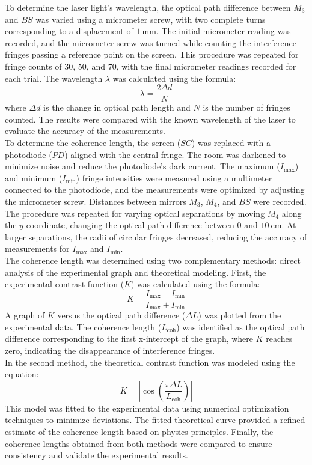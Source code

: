 \documentclass[a4paper,11pt]{article}
\begin{document}
To determine the laser light's wavelength, the optical path difference between \(M_3\) and \(BS\) was varied using a micrometer screw, with two complete turns corresponding to a displacement of \(1~\text{mm}\). The initial micrometer reading was recorded, and the micrometer screw was turned while counting the interference fringes passing a reference point on the screen. This procedure was repeated for fringe counts of \(30\), \(50\), and \(70\), with the final micrometer readings recorded for each trial. The wavelength \(\lambda\) was calculated using the formula:
\[
\lambda = \frac{2 \Delta d}{N}
\]
where \(\Delta d\) is the change in optical path length and \(N\) is the number of fringes counted. The results were compared with the known wavelength of the laser to evaluate the accuracy of the measurements.\\

To determine the coherence length, the screen (\(SC\)) was replaced with a photodiode (\(PD\)) aligned with the central fringe. The room was darkened to minimize noise and reduce the photodiode's dark current. The maximum (\(I_{\text{max}}\)) and minimum (\(I_{\text{min}}\)) fringe intensities were measured using a multimeter connected to the photodiode, and the measurements were optimized by adjusting the micrometer screw. Distances between mirrors \(M_3\), \(M_4\), and \(BS\) were recorded. The procedure was repeated for varying optical separations by moving \(M_4\) along the \(y\)-coordinate, changing the optical path difference between \(0\) and \(10~\text{cm}\). At larger separations, the radii of circular fringes decreased, reducing the accuracy of measurements for \(I_{\text{max}}\) and \(I_{\text{min}}\).\\

The coherence length was determined using two complementary methods: direct analysis of the experimental graph and theoretical modeling. First, the experimental contrast function (\(K\)) was calculated using the formula:
\[
K = \frac{I_{\text{max}} - I_{\text{min}}}{I_{\text{max}} + I_{\text{min}}}
\]
A graph of \(K\) versus the optical path difference (\(\Delta L\)) was plotted from the experimental data. The coherence length (\(L_{\text{coh}}\)) was identified as the optical path difference corresponding to the first x-intercept of the graph, where \(K\) reaches zero, indicating the disappearance of interference fringes.\\

In the second method, the theoretical contrast function was modeled using the equation:
\[
K = \left| \cos\left( \frac{\pi \Delta L}{L_{\text{coh}}} \right) \right|
\]
This model was fitted to the experimental data using numerical optimization techniques to minimize deviations. The fitted theoretical curve provided a refined estimate of the coherence length based on physics principles. Finally, the coherence lengths obtained from both methods were compared to ensure consistency and validate the experimental results.
\end{document}
